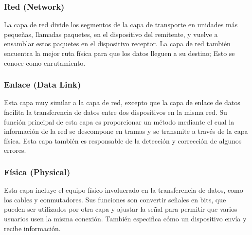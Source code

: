 \subsubsection{Red (Network)}
La capa de red divide los segmentos de la capa de transporte en unidades más pequeñas, llamadas paquetes, en el dispositivo del remitente, y vuelve a ensamblar estos paquetes en el dispositivo receptor. La capa de red también encuentra la mejor ruta física para que los datos lleguen a su destino; Esto se conoce como enrutamiento.
\subsubsection{Enlace (Data Link)}
Esta capa muy similar a la capa de red, excepto que la capa de enlace de datos facilita la transferencia de datos entre dos dispositivos en la misma red. Su función principal de esta capa es proporcionar un método mediante el cual la información de la red se descompone en tramas y se transmite a través de la capa física. Esta capa también es responsable de la detección y corrección de algunos errores.

\subsubsection{Física (Physical)}
Esta capa incluye el equipo físico involucrado en la transferencia de datos, como los cables y conmutadores.
Sus funciones son convertir señales en bits, que pueden ser utilizados por otra capa y ajustar la señal para permitir que varios usuarios usen la misma conexión. También especifica cómo un dispositivo envía y recibe información.
